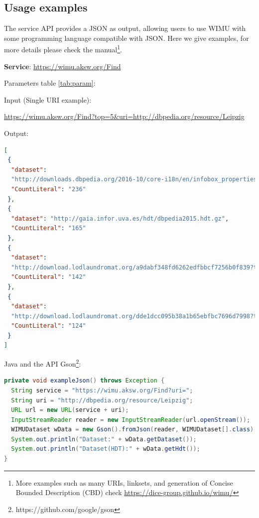 \subsection{Usage examples}
The service API provides a JSON as output, allowing users to use WIMU with some programming language compatible with JSON.
Here we give examples, for more details please check the manual\footnote{More examples such as many URIs, linksets, and generation of Concise Bounded Description (CBD) check \url{https://dice-group.github.io/wimu/}}.

\textbf{Service}: \url{https://wimu.aksw.org/Find}

Parameters table \ref{tab:param}:
\begin{table}[]
\centering
\caption{Parameters}
\label{tab:param}
\end{table}

Input (Single URI example): 

\url{https://wimu.aksw.org/Find?top=5&uri=http://dbpedia.org/resource/Leipzig}

Output:
\begin{lstlisting}[language=JSON]
[
 {
  "dataset": 
  "http://downloads.dbpedia.org/2016-10/core-i18n/en/infobox_properties_en.ttl.bz2",
  "CountLiteral": "236"
 },
 {
  "dataset": "http://gaia.infor.uva.es/hdt/dbpedia2015.hdt.gz",
  "CountLiteral": "165"
 },
 {
  "dataset": 
  "http://download.lodlaundromat.org/a9dabf348fd6262edfbbcf7256b0f839?type=hdt",
  "CountLiteral": "142"
 },
 {
  "dataset": 
  "http://download.lodlaundromat.org/dde1dcc095b38a1b65ebfbc7696d7998?type=hdt",
  "CountLiteral": "124"
 }
]
\end{lstlisting}

Java and the API Gson\footnote{https://github.com/google/gson}:
\begin{lstlisting}[language=JAVA]
private void exampleJson() throws Exception {
  String service = "https://wimu.aksw.org/Find?uri=";
  String uri = "http://dbpedia.org/resource/Leipzig";
  URL url = new URL(service + uri);
  InputStreamReader reader = new InputStreamReader(url.openStream());
  WIMUDataset wData = new Gson().fromJson(reader, WIMUDataset[].class)[0];
  System.out.println("Dataset:" + wData.getDataset());
  System.out.println("Dataset(HDT):" + wData.getHdt());
}
\end{lstlisting}


